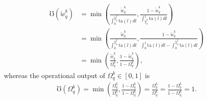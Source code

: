 \documentclass[hidelinks, nonatbib]{elsarticle}
\begin{document}
\begin{enumerate}
    \begin{align}
        \mho(\tilde{w}_{q}^{k})
        &=
        \min\left(
            \frac{
                \tilde{w}_{q}^{k}
            }{
                \int_{0}^{
                    \tilde{T}_{q}^{k}
                }{
                    \text{ta}(l)
                    dl
                }
            }
            ,
            \frac{
                1 - \tilde{w}_{q}^{k}
            }{
                \int_{
                    \tilde{T}_{q}^{k}
                }^{1}{
                    \text{ta}(l)
                    dl
                }
            }
        \right)
        \\
        &=
        \min\left(
            \frac{
                \tilde{w}_{q}^{k}
            }{
                \int_{0}^{
                    \tilde{T}_{q}^{k}
                }{
                    \text{ta}(l)
                    dl
                }
            }
            ,
            \frac{
                1 - \tilde{w}_{q}^{k}
            }{
                \int_{0}^{1}{
                    \text{ta}(l)
                    dl
                }
                -
                \int_{0}^{
                    \tilde{T}_{q}^{k}
                }{
                    \text{ta}(l)
                    dl
                }
            }
        \right)
        \\
        &=
        \min\left(
            \frac{
                \tilde{w}_{q}^{k}
            }{
                \Omega_{q}^{k}
            }
            ,
            \frac{
                1 - \tilde{w}_{q}^{k}
            }{
                1 - \Omega_{q}^{k}
            }
        \right)
        ,
    \end{align}
    whereas the operational output of $\Omega_{q}^{k} \in [0,1]$ is
    \begin{align}
        \mho(\Omega_{q}^{k}) 
        =
        \min\left(
            \frac{
                \Omega_{q}^{k}
            }{
                \Omega_{q}^{k}
            }
            ,
            \frac{
                1 - \Omega_{q}^{k}
            }{
                1 - \Omega_{q}^{k}
            }
        \right)
        =
        \frac{
            \Omega_{q}^{k}
        }{
            \Omega_{q}^{k}
        }
        =
        \frac{
            1 - \Omega_{q}^{k}
        }{
            1 - \Omega_{q}^{k}
        }
        =
        1
        .
    \end{align}


\end{enumerate}
\end{document}
